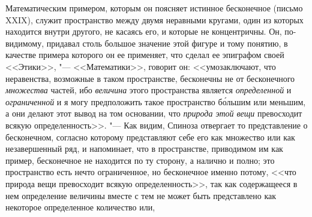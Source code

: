 Математическим примером, которым он поясняет истинное бесконечное (письмо
XXIX), служит пространство между двумя неравными кругами, один из которых
находится внутри другого, не касаясь его, и которые не концентричны. Он,
по-видимому, придавал столь большое значение этой фигуре и тому понятию, в
качестве примера
которого он ее применяет, что сделал ее
эпиграфом своей
<<Этики>>, "--- <<Математики>>, говорит он:
<<умозаключают, что неравенства, возможные в таком пространстве, бесконечны
не от бесконечного {\em множества} частей, ибо
{\em величина} этого пространства является
{\em определенной} и
{\em ограниченной} и я могу предположить такое
пространство б\'{о}льшим или меньшим, а они делают этот вывод на том основании,
что {\em природа этой вещи} превосходит всякую
определенность>>. "--- Как видим, Спиноза
отвергает то представление о бесконечном, согласно которому представляют
себе его как множество или как незавершенный ряд, и напоминает, что в
пространстве, приводимом им как пример, бесконечное не находится по ту
сторону, а налично и полно; это пространство есть нечто ограниченное, но
бесконечное именно потому, <<что природа вещи превосходит всякую
определенность>>, так как содержащееся в нем определение величины вместе с
тем не может быть представлено как некоторое определенное количество или,
